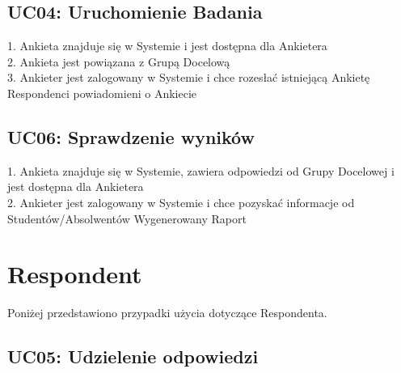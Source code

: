 \subsection{UC04: Uruchomienie Badania}
\label{Chapter334}

{
1. Ankieta znajduje się w Systemie i jest dostępna dla Ankietera \\
2. Ankieta jest powiązana z Grupą Docelową \\
3. Ankieter jest zalogowany w Systemie i chce rozesłać istniejącą Ankietę
}
{Respondenci powiadomieni o Ankiecie}{}
{}
{}

\subsection{UC06: Sprawdzenie wyników}
\label{Chapter335}

{
1. Ankieta znajduje się w Systemie, zawiera odpowiedzi od Grupy Docelowej i jest dostępna dla Ankietera \\
2. Ankieter jest zalogowany w Systemie i chce pozyskać informacje od Studentów/Absolwentów
}
{Wygenerowany Raport}{}
{}

\section{Respondent}
\label{Chapter34}

Poniżej przedstawiono przypadki użycia dotyczące Respondenta.

\subsection{UC05: Udzielenie odpowiedzi}
\label{Chapter341}

